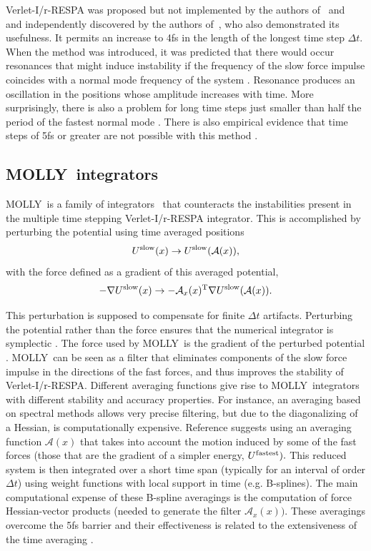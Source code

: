 \documentclass[11pt]{article}
\newcommand{\MOLLY}{\textsc{MOLLY\ }}
\begin{document}
Verlet-I/r-RESPA was proposed but not implemented by the authors
of~\cite{Grub89} and~\cite{GHWS91} and independently
discovered by the authors of~\cite{TuBM92}, who also
demonstrated its usefulness. It permits an increase to 4\thinspace fs
in the length of the longest time step $\Delta t.$ When the method was
introduced, it was predicted that there would occur resonances that
might induce instability if the frequency of the slow force impulse
coincides with a normal mode frequency of the system
\cite{GHWS91,BiSk93}. Resonance produces an oscillation in the positions
whose amplitude increases with time. More surprisingly, there is also
a problem for long time steps just smaller than half the period of the
fastest normal mode \cite{GaSS98b,BaSc98b}. There is also empirical
evidence that time steps of 5\thinspace fs or greater are not possible
with this method \cite{BiSS97}.


\subsection{\MOLLY integrators}
\MOLLY is a family of integrators~\cite{GaSS98b} that counteracts the
instabilities present 
in the multiple time stepping Verlet-I/r-RESPA integrator. This is
accomplished by perturbing the potential using time averaged positions 
\begin{equation}
U^{{\rm slow}}(x)\rightarrow U^{{\rm slow}}({\mathcal{A}}(x)),
\end{equation}
with the force defined as a gradient of this averaged potential, 
\begin{equation}
-\nabla U^{{\rm slow}}(x)\rightarrow -{\mathcal A}_{x}(x)^{{\rm T}}\nabla U^{
{\rm slow}}({\mathcal A}(x)).
\end{equation}

This perturbation is supposed to compensate for finite $\Delta t$ artifacts.
Perturbing the potential rather than the force ensures that the numerical
integrator is symplectic \cite{SaCa94}. The force used by \MOLLY is
the gradient 
of the perturbed potential \cite{IzRS99}. \MOLLY can be seen as a filter that
eliminates components of the slow force impulse in the directions of the
fast forces, and thus improves the stability of Verlet-I/r-RESPA. Different
averaging functions give rise to \MOLLY integrators with different stability
and accuracy properties. For instance, an averaging based on spectral
methods allows very precise filtering, but due to the diagonalizing of a
Hessian, is computationally expensive. Reference \cite{GaSS98b} suggests
using an averaging function ${\mathcal A}(x)$ that takes into account
the motion 
induced by some of the fast forces (those that are the gradient of a simpler
energy, $U^{{\rm fastest}}).$ This reduced system is then integrated over a
short time span (typically for an interval of order $\Delta t$) using weight
functions with local support in time (e.g. B-splines). The main
computational expense of these B-spline averagings is the computation of
force Hessian-vector products (needed to generate the filter ${\mathcal A}
_{x}(x)).$ These averagings overcome the 5\thinspace fs barrier and their
effectiveness is related to the extensiveness of the time averaging \cite
{SkIz98}.
\end{document}
